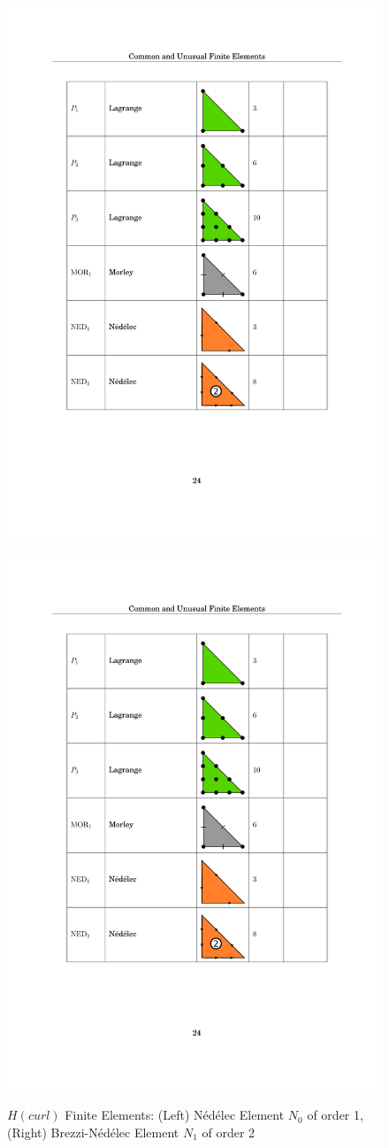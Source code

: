 \begin{figure}[ht]
\centerline{
\includegraphics[width=.3\textwidth]{figures/part_4/Ned0.pdf}~~~~~~~~ 
\includegraphics[width=.3\textwidth]{figures/part_4/Ned1.pdf}}
\caption{\label{fig:HcurlFE} $H(curl)$ Finite Elements: (Left)  N\'ed\'elec Element $N_0$ of order 1, (Right)  Brezzi-N\'ed\'elec Element $N_1$ of order 2}
\end{figure}

